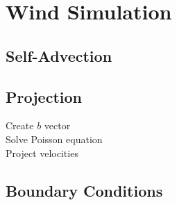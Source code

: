\section{Wind Simulation}

\subsection{Self-Advection}

\subsection{Projection}

\begin{description}
	\item[Create $b$ vector]
	\item[Solve Poisson equation]
	\item[Project velocities]
\end{description}

\subsection{Boundary Conditions}
